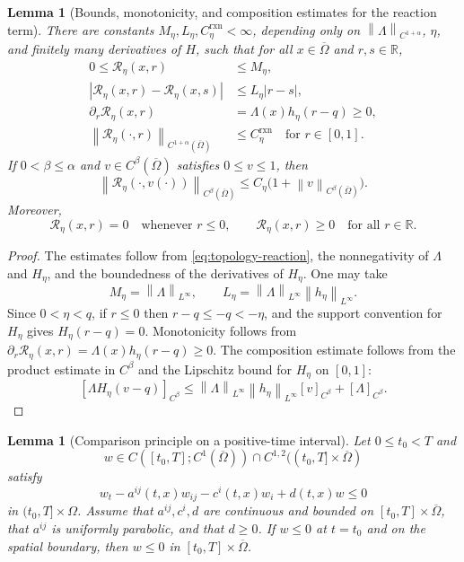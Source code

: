 \documentclass[11pt]{article}
\newtheorem{lemma}[theorem]{Lemma}
\theoremstyle{remark}
\newcommand{\R}{\mathbb{R}}
\newcommand{\norm}[1]{\left\lVert #1\right\rVert}
\newcommand{\cT}{\mathcal{R}}
\begin{document}
\begin{lemma}[Bounds, monotonicity, and composition estimates for the reaction term]\label{lem:reaction}
There are constants $M_\eta,L_\eta,C_\eta^{\mathrm{rxn}}<\infty$, depending only on $\norm{\Lambda}_{C^{1+\alpha}}$, $\eta$, and finitely many derivatives of $H$, such that for all $x\in\overline\Omega$ and $r,s\in\R$,
\begin{align}
        0\le \cT_\eta(x,r)&\le M_\eta,\label{eq:T-bound}\\
        |\cT_\eta(x,r)-\cT_\eta(x,s)|&\le L_\eta |r-s|,\label{eq:T-lip}\\
        \partial_r\cT_\eta(x,r)&=\Lambda(x)h_\eta(r-q)\ge0,\label{eq:T-monotone}\\
        \norm{\cT_\eta(\cdot,r)}_{C^{1+\alpha}(\overline\Omega)}&\le C_\eta^{\mathrm{rxn}}
        \quad \text{for } r\in[0,1].\label{eq:T-xbound}
\end{align}
If $0<\beta\le\alpha$ and $v\in C^\beta(\overline\Omega)$ satisfies $0\le v\le1$, then
\begin{equation}\label{eq:T-composition}
        \norm{\cT_\eta(\cdot,v(\cdot))}_{C^\beta(\overline\Omega)}
        \le C_\eta\bigl(1+\norm{v}_{C^\beta(\overline\Omega)}\bigr).
\end{equation}
Moreover,
\begin{equation}\label{eq:T-barrier}
        \cT_\eta(x,r)=0\quad\text{whenever } r\le0,
        \qquad
        \cT_\eta(x,r)\ge0\quad\text{for all } r\in\R .
\end{equation}
\end{lemma}

\begin{proof}
The estimates follow from \eqref{eq:topology-reaction}, the nonnegativity of $\Lambda$ and $H_\eta$, and the boundedness of the derivatives of $H_\eta$.  One may take
\[
        M_\eta=\norm{\Lambda}_{L^\infty},
        \qquad
        L_\eta=\norm{\Lambda}_{L^\infty}\norm{h_\eta}_{L^\infty}.
\]
Since $0<\eta<q$, if $r\le0$ then $r-q\le -q<-\eta$, and the support convention for $H_\eta$ gives $H_\eta(r-q)=0$.  Monotonicity follows from
$\partial_r\cT_\eta(x,r)=\Lambda(x)h_\eta(r-q)\ge0$.
The composition estimate follows from the product estimate in $C^\beta$ and the Lipschitz bound for $H_\eta$ on $[0,1]$:
\[
 [\Lambda H_\eta(v-q)]_{C^\beta}
 \le \norm{\Lambda}_{L^\infty}\norm{h_\eta}_{L^\infty}[v]_{C^\beta}
 +[\Lambda]_{C^\beta}.
\]
\end{proof}

\begin{lemma}[Comparison principle on a positive-time interval]\label{lem:comparison}
Let $0\le t_0<T$ and
\[
 w\in C([t_0,T];C^1(\overline\Omega))\cap C^{1,2}((t_0,T]\times\overline\Omega)
\]
satisfy
\[
 w_t-a^{ij}(t,x)w_{ij}-c^i(t,x)w_i+d(t,x)w\le0
\]
in $(t_0,T]\times\Omega$.  Assume that $a^{ij},c^i,d$ are continuous and bounded on $[t_0,T]\times\overline\Omega$, that $a^{ij}$ is uniformly parabolic, and that $d\ge0$.  If $w\le0$ at $t=t_0$ and on the spatial boundary, then $w\le0$ in $[t_0,T]\times\overline\Omega$.
\end{lemma}
\end{document}
